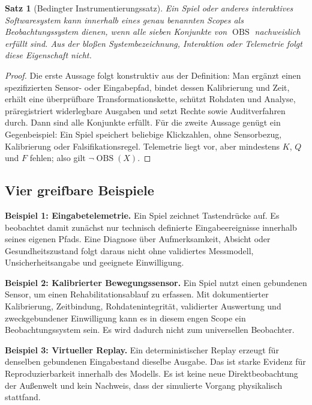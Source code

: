 \documentclass[11pt,a4paper]{article}
\newtheorem{satz}{Satz}[section]
\theoremstyle{remark}
\begin{document}
\begin{satz}[Bedingter Instrumentierungssatz]
Ein Spiel oder anderes interaktives Softwaresystem kann innerhalb eines
genau benannten Scopes als Beobachtungssystem dienen, wenn alle sieben
Konjunkte von $\operatorname{OBS}$ nachweislich erfüllt sind. Aus der bloßen
Systembezeichnung, Interaktion oder Telemetrie folgt diese Eigenschaft nicht.
\end{satz}

\begin{proof}
Die erste Aussage folgt konstruktiv aus der Definition: Man ergänzt einen
spezifizierten Sensor- oder Eingabepfad, bindet dessen Kalibrierung und Zeit,
erhält eine überprüfbare Transformationskette, schützt Rohdaten und Analyse,
präregistriert widerlegbare Ausgaben und setzt Rechte sowie Auditverfahren
durch. Dann sind alle Konjunkte erfüllt. Für die zweite Aussage genügt ein
Gegenbeispiel: Ein Spiel speichert beliebige Klickzahlen, ohne Sensorbezug,
Kalibrierung oder Falsifikationsregel. Telemetrie liegt vor, aber mindestens
$K$, $Q$ und $F$ fehlen; also gilt $\neg\operatorname{OBS}(X)$.
\end{proof}

\subsection{Vier greifbare Beispiele}

\textbf{Beispiel 1: Eingabetelemetrie.}
Ein Spiel zeichnet Tastendrücke auf. Es beobachtet damit zunächst nur
technisch definierte Eingabeereignisse innerhalb seines eigenen Pfads. Eine
Diagnose über Aufmerksamkeit, Absicht oder Gesundheitszustand folgt daraus
nicht ohne validiertes Messmodell, Unsicherheitsangabe und geeignete
Einwilligung.

\textbf{Beispiel 2: Kalibrierter Bewegungssensor.}
Ein Spiel nutzt einen gebundenen Sensor, um einen Rehabilitationsablauf zu
erfassen. Mit dokumentierter Kalibrierung, Zeitbindung, Rohdatenintegrität,
validierter Auswertung und zweckgebundener Einwilligung kann es in diesem
engen Scope ein Beobachtungssystem sein. Es wird dadurch nicht zum
universellen Beobachter.

\textbf{Beispiel 3: Virtueller Replay.}
Ein deterministischer Replay erzeugt für denselben gebundenen Eingabestand
dieselbe Ausgabe. Das ist starke Evidenz für Reproduzierbarkeit innerhalb des
Modells. Es ist keine neue Direktbeobachtung der Außenwelt und kein Nachweis,
dass der simulierte Vorgang physikalisch stattfand.
\end{document}
